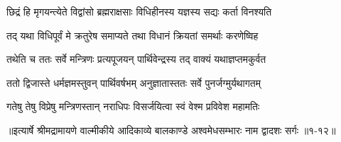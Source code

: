 \twolineshloka
{छिद्रं हि मृगयन्त्येते विद्वांसो ब्रह्मराक्षसाः}
{विधिहीनस्य यज्ञस्य सद्यः कर्ता विनश्यति} %

\twolineshloka
{तद् यथा विधिपूर्वं मे क्रतुरेष समाप्यते}
{तथा विधानं क्रियतां समर्थाः करणेष्विह} %

\twolineshloka
{तथेति च ततः सर्वे मन्त्रिणः प्रत्यपूजयन्}
{पार्थिवेन्द्रस्य तद् वाक्यं यथाज्ञप्तमकुर्वत} %

\twolineshloka
{ततो द्विजास्ते धर्मज्ञमस्तुवन् पार्थिवर्षभम्}
{अनुज्ञातास्ततः सर्वे पुनर्जग्मुर्यथागतम्} %

\twolineshloka
{गतेषु तेषु विप्रेषु मन्त्रिणस्तान् नराधिपः}
{विसर्जयित्वा स्वं वेश्म प्रविवेश महामतिः} %


॥इत्यार्षे श्रीमद्रामायणे वाल्मीकीये आदिकाव्ये बालकाण्डे अश्वमेधसम्भारः नाम द्वादशः सर्गः ॥१-१२॥
